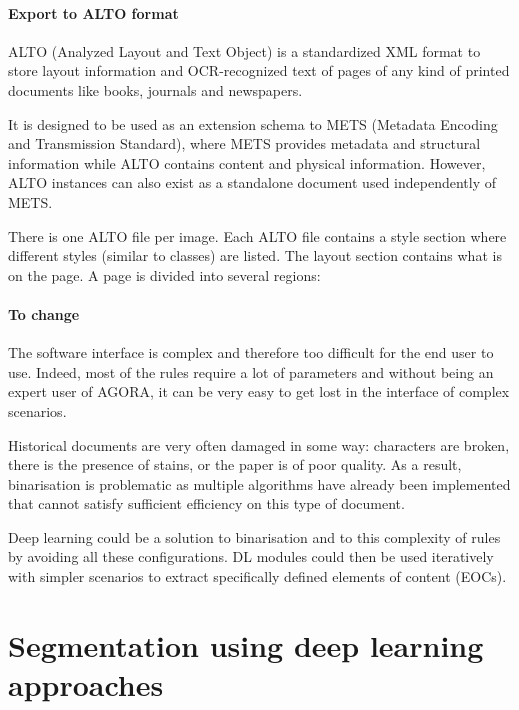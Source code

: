 \documentclass{polytech/polytech}
\numberwithin{figure}{chapter}
\begin{document}
\paragraph{Export to ALTO format}

ALTO (Analyzed Layout and Text Object) is a standardized XML format to store layout information and OCR-recognized text of pages of any kind of printed documents like books, journals and newspapers.

It is designed to be used as an extension schema to METS (Metadata Encoding and Transmission Standard), where METS provides metadata and structural information while ALTO contains content and physical information.
However, ALTO instances can also exist as a standalone document used independently of METS.

There is one ALTO file per image.
Each ALTO file contains a style section where different styles (similar to classes) are listed.
The layout section contains what is on the page.
A page is divided into several regions:

\label{margins}

\paragraph{To change}

The software interface is complex and therefore too difficult for the end user to use.
Indeed, most of the rules require a lot of parameters and without being an expert user of AGORA, it can be very easy to get lost in the interface of complex scenarios.

Historical documents are very often damaged in some way: characters are broken, there is the presence of stains, or the paper is of poor quality.
As a result, binarisation is problematic as multiple algorithms have already been implemented that cannot satisfy sufficient efficiency on this type of document.

Deep learning could be a solution to binarisation and to this complexity of rules by avoiding all these configurations.
DL modules could then be used iteratively with simpler scenarios to extract specifically defined elements of content (EOCs).


\section{Segmentation using deep learning approaches}
\end{document}
